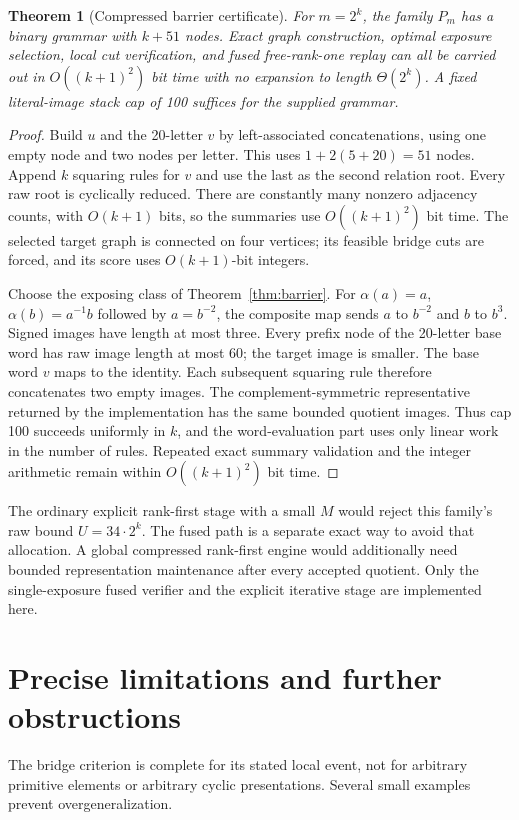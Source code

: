 \documentclass[11pt,letterpaper]{article}
\newtheorem{theorem}{Theorem}[section]
\theoremstyle{definition}\newtheorem{definition}[theorem]{Definition}
\begin{document}
\begin{theorem}[Compressed barrier certificate]\label{thm:compressedbarrier}
For $m=2^k$, the family $P_m$ has a binary grammar with $k+51$ nodes. Exact graph construction, optimal exposure selection, local cut verification, and fused free-rank-one replay can all be carried out in $O((k+1)^2)$ bit time with no expansion to length $\Theta(2^k)$. A fixed literal-image stack cap of 100 suffices for the supplied grammar.
\end{theorem}
\begin{proof}
Build $u$ and the 20-letter $v$ by left-associated concatenations, using one empty node and two nodes per letter. This uses $1+2(5+20)=51$ nodes. Append $k$ squaring rules for $v$ and use the last as the second relation root. Every raw root is cyclically reduced. There are constantly many nonzero adjacency counts, with $O(k+1)$ bits, so the summaries use $O((k+1)^2)$ bit time. The selected target graph is connected on four vertices; its feasible bridge cuts are forced, and its score uses $O(k+1)$-bit integers.

Choose the exposing class of Theorem~\ref{thm:barrier}. For $\alpha(a)=a$, $\alpha(b)=a^{-1}b$ followed by $a=b^{-2}$, the composite map sends $a$ to $b^{-2}$ and $b$ to $b^3$. Signed images have length at most three. Every prefix node of the 20-letter base word has raw image length at most 60; the target image is smaller. The base word $v$ maps to the identity. Each subsequent squaring rule therefore concatenates two empty images. The complement-symmetric representative returned by the implementation has the same bounded quotient images. Thus cap 100 succeeds uniformly in $k$, and the word-evaluation part uses only linear work in the number of rules. Repeated exact summary validation and the integer arithmetic remain within $O((k+1)^2)$ bit time.
\end{proof}

The ordinary explicit rank-first stage with a small $M$ would reject this family's raw bound $U=34\cdot2^k$. The fused path is a separate exact way to avoid that allocation. A global compressed rank-first engine would additionally need bounded representation maintenance after every accepted quotient. Only the single-exposure fused verifier and the explicit iterative stage are implemented here.

\section{Precise limitations and further obstructions}\label{sec:limits}
The bridge criterion is complete for its stated local event, not for arbitrary primitive elements or arbitrary cyclic presentations. Several small examples prevent overgeneralization.
\end{document}
